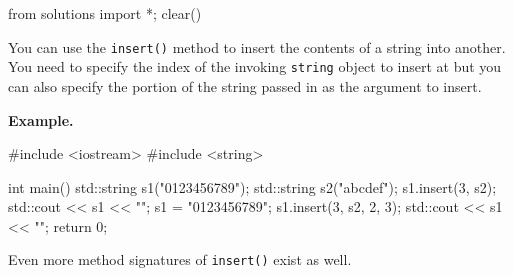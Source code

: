 \begin{python0}
from solutions import *; clear()
\end{python0}

You can use the \texttt{insert()} method to insert the contents of a
string into another. You need to specify the index of the invoking
\texttt{string} object to insert at but you can also specify the portion
of the string passed in as the argument to insert.

\textbf{Example.}

\begin{console}
#include <iostream>
#include <string>

int main()
{   
    std::string s1("0123456789");
    std::string s2("abcdef");
    s1.insert(3, s2);
    std::cout << s1 << "\n";
    s1 = "0123456789";
    s1.insert(3, s2, 2, 3);
    std::cout << s1 << "\n";
    return 0;
} 
\end{console}

Even more method signatures of \texttt{insert()} exist as well.

